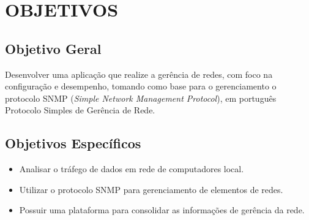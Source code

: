 \chapter{OBJETIVOS}


\section{Objetivo Geral}

\par Desenvolver uma aplicação que realize a gerência de redes, com foco na
configuração e desempenho, tomando como base para o gerenciamento o
protocolo SNMP (\textit{Simple Network Management Protocol}), em português
Protocolo Simples de Gerência de Rede.

\section{Objetivos Específicos}

\begin{itemize}
  
  \item Analisar o tráfego de dados em rede de computadores local.
  
  \item Utilizar o protocolo SNMP para gerenciamento de elementos de redes.
  
  \item Possuir uma plataforma para consolidar as informações de gerência da
  rede.
\end{itemize}

